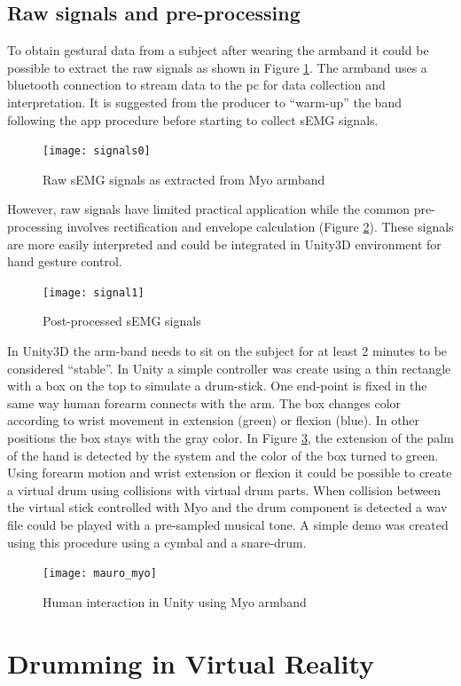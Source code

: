 \documentclass{vgtc}
\begin{document}
\subsection{Raw signals and pre-processing}
To obtain gestural data from a subject after wearing the armband it could be possible to extract the raw signals as shown in Figure \ref{fig:sig0}. The armband uses a bluetooth connection to stream data to the pc for data collection and interpretation. It is suggested from the producer to “warm-up” the band following the app procedure before starting to collect sEMG signals.
\begin{figure}[h]
\texttt{[image: signals0]}
\caption{Raw sEMG signals as extracted from Myo armband}
\centering
\label{fig:sig0}
\end{figure}
However, raw signals have limited practical application while the common pre-processing involves rectification and envelope calculation (Figure \ref{fig:sig1}). These signals are more easily interpreted and could be integrated in Unity3D environment for hand gesture control. 
\begin{figure}[h]
\texttt{[image: signal1]}
\caption{Post-processed sEMG signals}
\centering
\label{fig:sig1}
\end{figure}
In Unity3D the arm-band needs to sit on the subject for at least 2 minutes to be considered “stable”. In Unity a simple controller was create using a thin rectangle with a box on the top to simulate a drum-stick. One end-point is fixed in the same way human forearm connects with the arm. The box changes color according to wrist movement in extension (green) or flexion (blue). In other positions the box stays with the gray color. In Figure \ref{fig:mm1}, the extension of the palm of the hand is detected by the system and the color of the box turned to green. Using forearm motion and wrist extension or flexion it could be possible to create a virtual drum using collisions with virtual drum parts. When collision between the virtual stick controlled with Myo and the drum component is detected a wav file could be played with a pre-sampled musical tone. A simple demo was created using this procedure using a cymbal and a snare-drum.
\begin{figure}[h]
\texttt{[image: mauro\_myo]}
\caption{Human interaction in Unity using Myo armband}
\centering
\label{fig:mm1}
\end{figure}

\section{Drumming in Virtual Reality}
\end{document}
